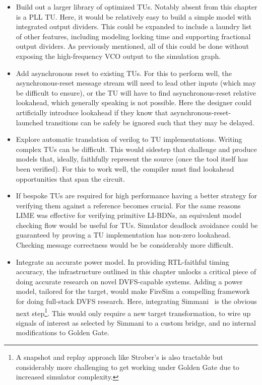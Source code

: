 \begin{itemize}
\item Build out a larger library of optimized TUs. Notably absent from this chapter
is a PLL TU. Here, it would be relatively easy to build a simple model with
integrated output dividers. This could be expanded to include a laundry
list of other features, including modeling locking time and supporting
fractional output dividers. As previously mentioned, all of this could be
done without exposing the high-frequency VCO output to the simulation graph.

\item Add asynchronous reset to existing TUs. For this to perform well, the asynchronous-reset
message stream will need to lead other inputs (which may be
difficult to ensure), or the TU will have to find asynchronous-reset relative
lookahead, which generally speaking is not possible. Here the designer could artificially
introduce lookahead if they know that asynchronous-reset-launched transitions
can be safely be ignored such that they may be delayed.

\item Explore automatic translation of verilog to TU implementations. Writing complex
TUs can be difficult. This would sidestep that challenge and produce models
that, ideally, faithfully represent the source (once the tool itself has been verified). For this to work well, the compiler must
find lookahead opportunities that span the circuit.

\item If bespoke TUs are required for high performance having a better strategy for
verifying them against a reference becomes crucial. For the same reasons LIME
was effective for verifying primitive LI-BDNs, an equivalent model checking flow
would be useful for TUs. Simulator deadlock avoidance could be guaranteed by
proving a TU implementation has non-zero lookahead. Checking message
correctness would be be considerably more difficult.

\item Integrate an accurate power model. In providing RTL-faithful timing
    accuracy, the infrastructure outlined in this chapter unlocks a critical
    piece of doing accurate research on novel DVFS-capable systems.  Adding
    a power model, tailored for the target, would make FireSim a compelling framework for doing full-stack DVFS research. Here, integrating
    Simmani~\cite{Simmani} is the obvious next step\footnote{A snapshot
    and replay approach like Strober's is also tractable but considerably
    more challenging to get working under Golden Gate due to increased
    simulator complexity.}. This would only require a new target transformation, to wire up signals of interest
    as selected by Simmani to a custom bridge, and no internal modifications to Golden Gate.
\end{itemize}

